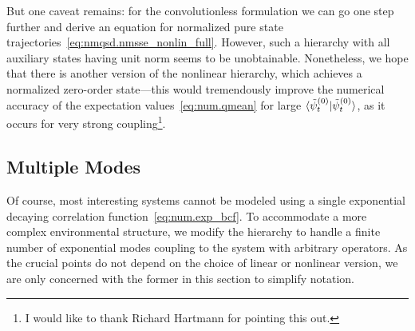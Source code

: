 But one caveat remains: for the convolutionless formulation we can go one step further and derive an equation for normalized pure state trajectories~\ref{eq:nmqsd.nmsse_nonlin_full}.
However, such a hierarchy with all auxiliary states having unit norm seems to be unobtainable.
Nonetheless, we hope that there is another version of the nonlinear hierarchy, which achieves a normalized zero-order state---this would tremendously improve the numerical accuracy of the expectation values~\ref{eq:num.qmean} for large $\langle \tilde\psi_t^{(0)} | \tilde\psi_t^{(0)} \rangle$, as it occurs for very strong coupling\footnote{%
  I would like to thank Richard Hartmann for pointing this out.
}.



\subsection{Multiple Modes}
\label{sub:num.sheom.nonlin}

Of course, most interesting systems cannot be modeled using a single exponential decaying correlation function~\ref{eq:num.exp_bcf}.
To accommodate a more complex environmental structure, we modify the hierarchy to handle a finite number of exponential modes coupling to the system with arbitrary operators.
As the crucial points do not depend on the choice of linear or nonlinear version, we are only concerned with the former in this section to simplify notation.

